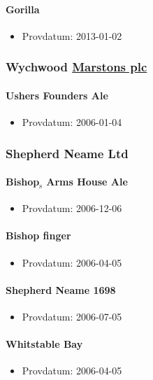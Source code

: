 \documentclass[11pt]{article}
\begin{document}
\paragraph{Gorilla}
\label{sec:org0a6bb25}
\begin{itemize}
\item Provdatum: 2013-01-02
\end{itemize}
\subsubsection{Wychwood \underline{Marstons plc}}
\label{sec:org8fc1027}
\paragraph{Ushers Founders Ale}
\label{sec:org3b71f80}
\begin{itemize}
\item Provdatum: 2006-01-04
\end{itemize}
\subsubsection{Shepherd Neame Ltd}
\label{sec:org0004307}
\paragraph{Bishop\(_{\text{s}}\) Arms House Ale}
\label{sec:org41949ed}
\begin{itemize}
\item Provdatum: 2006-12-06
\end{itemize}
\paragraph{Bishop finger}
\label{sec:orgf1db566}
\begin{itemize}
\item Provdatum: 2006-04-05
\end{itemize}
\paragraph{Shepherd Neame 1698}
\label{sec:orgdc2face}
\begin{itemize}
\item Provdatum: 2006-07-05
\end{itemize}
\paragraph{Whitstable Bay}
\label{sec:org03ef8b4}
\begin{itemize}
\item Provdatum: 2006-04-05
\end{itemize}
\end{document}
